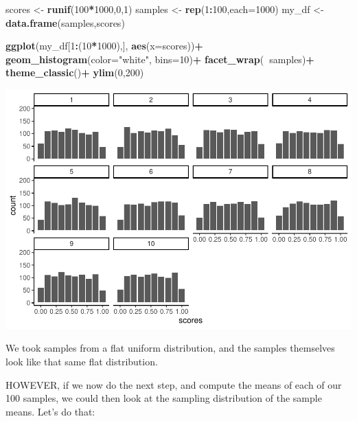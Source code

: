 \documentclass[]{book}
\newenvironment{Shaded}{\begin{snugshade}}{\end{snugshade}}
\newcommand{\KeywordTok}[1]{\textcolor[rgb]{0.13,0.29,0.53}{\textbf{#1}}}
\newcommand{\DataTypeTok}[1]{\textcolor[rgb]{0.13,0.29,0.53}{#1}}
\newcommand{\DecValTok}[1]{\textcolor[rgb]{0.00,0.00,0.81}{#1}}
\newcommand{\StringTok}[1]{\textcolor[rgb]{0.31,0.60,0.02}{#1}}
\newcommand{\OperatorTok}[1]{\textcolor[rgb]{0.81,0.36,0.00}{\textbf{#1}}}
\newcommand{\NormalTok}[1]{#1}
\begin{document}
\begin{Shaded}
\begin{Highlighting}[]
\NormalTok{scores <-}\StringTok{ }\KeywordTok{runif}\NormalTok{(}\DecValTok{100}\OperatorTok{*}\DecValTok{1000}\NormalTok{,}\DecValTok{0}\NormalTok{,}\DecValTok{1}\NormalTok{)}
\NormalTok{samples <-}\StringTok{ }\KeywordTok{rep}\NormalTok{(}\DecValTok{1}\OperatorTok{:}\DecValTok{100}\NormalTok{,}\DataTypeTok{each=}\DecValTok{1000}\NormalTok{)}
\NormalTok{my_df <-}\StringTok{ }\KeywordTok{data.frame}\NormalTok{(samples,scores)}

\KeywordTok{ggplot}\NormalTok{(my_df[}\DecValTok{1}\OperatorTok{:}\NormalTok{(}\DecValTok{10}\OperatorTok{*}\DecValTok{1000}\NormalTok{),], }\KeywordTok{aes}\NormalTok{(}\DataTypeTok{x=}\NormalTok{scores))}\OperatorTok{+}
\StringTok{  }\KeywordTok{geom_histogram}\NormalTok{(}\DataTypeTok{color=}\StringTok{"white"}\NormalTok{, }\DataTypeTok{bins=}\DecValTok{10}\NormalTok{)}\OperatorTok{+}
\StringTok{  }\KeywordTok{facet_wrap}\NormalTok{(}\OperatorTok{~}\NormalTok{samples)}\OperatorTok{+}
\StringTok{  }\KeywordTok{theme_classic}\NormalTok{()}\OperatorTok{+}
\StringTok{  }\KeywordTok{ylim}\NormalTok{(}\DecValTok{0}\NormalTok{,}\DecValTok{200}\NormalTok{)}
\end{Highlighting}
\end{Shaded}

\includegraphics{Statistics_Lab_files/figure-latex/unnamed-chunk-122-1.pdf}

We took samples from a flat uniform distribution, and the samples
themselves look like that same flat distribution.

HOWEVER, if we now do the next step, and compute the means of each of
our 100 samples, we could then look at the sampling distribution of the
sample means. Let's do that:
\end{document}
